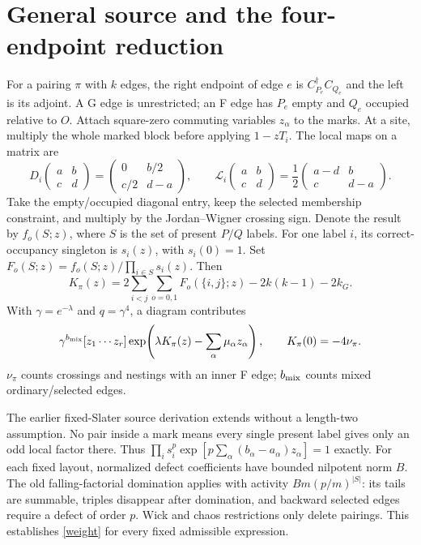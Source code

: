 \documentclass[11pt]{article}
\begin{document}
\newpage
\section{General source and the four-endpoint reduction}
For a pairing $\pi$ with $k$ edges, the right endpoint of edge $e$ is
$C_{P_e}^\dagger C_{Q_e}$ and the left is its adjoint. A G edge is
unrestricted; an F edge has $P_e$ empty and $Q_e$ occupied relative to
$O$. Attach square-zero commuting variables $z_\alpha$ to the marks.
At a site, multiply the whole marked block before applying $1-zT_i$.
The local maps on a matrix are
\[
 D_i\begin{pmatrix}a&b\\c&d\end{pmatrix}
 =\begin{pmatrix}0&b/2\\c/2&d-a\end{pmatrix},\qquad
 \mathcal L_i\begin{pmatrix}a&b\\c&d\end{pmatrix}
 =\frac12\begin{pmatrix}a-d&b\\c&d-a\end{pmatrix}.
\]
Take the empty/occupied diagonal entry, keep the selected membership
constraint, and multiply by the Jordan--Wigner crossing sign. Denote the
result by $f_o(S;z)$, where $S$ is the set of present $P/Q$ labels.
For one label $i$, its correct-occupancy singleton is $s_i(z)$, with
$s_i(0)=1$. Set $F_o(S;z)=f_o(S;z)/\prod_{i\in S}s_i(z)$. Then
\begin{equation}
 K_\pi(z)=2\sum_{i<j}\sum_{o=0,1}F_o(\{i,j\};z)
             -2k(k-1)-2k_G .\label{K}
\end{equation}
With $\gamma=e^{-\lambda}$ and $q=\gamma^4$, a diagram contributes
\begin{equation}
 \gamma^{b_{\rm mix}}[z_1\cdots z_r]
 \exp\!\left(\lambda K_\pi(z)-\sum_\alpha\mu_\alpha z_\alpha\right),
 \qquad K_\pi(0)=-4\nu_\pi .\label{weight}
\end{equation}
$\nu_\pi$ counts crossings and nestings with an inner F edge;
$b_{\rm mix}$ counts mixed ordinary/selected edges.

The earlier fixed-Slater source derivation \cite{composite} extends
without a length-two assumption. No pair inside a mark means every
single present label gives only an odd local factor there. Thus
$\prod_i s_i^p\exp[p\sum_\alpha(b_\alpha-a_\alpha)z_\alpha]=1$ exactly.
For each fixed layout, normalized defect coefficients have bounded
nilpotent norm $B$. The old falling-factorial domination applies with
activity $B m(p/m)^{|S|}$: its tails are summable, triples disappear
after domination, and backward selected edges require a defect of
order $p$. Wick and chaos restrictions only delete pairings.
This establishes \eqref{weight} for every fixed admissible expression.
\end{document}
